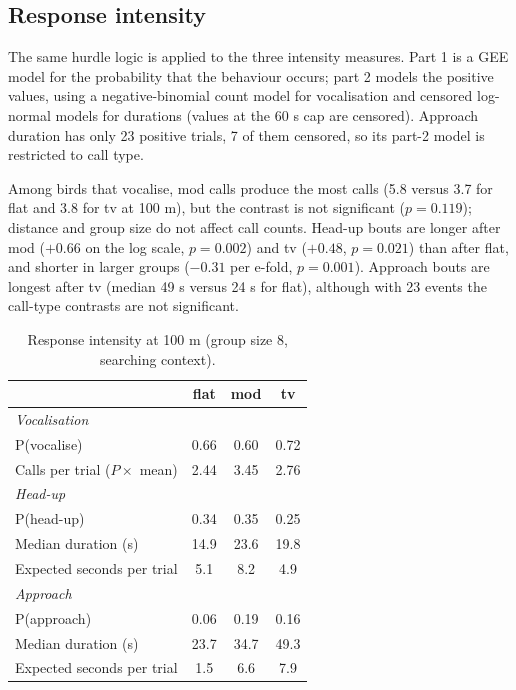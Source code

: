\documentclass{apmcmthesis}
\begin{document}
\subsection{Response intensity}
The same hurdle logic is applied to the three intensity measures. Part 1 is a GEE model for the
probability that the behaviour occurs; part 2 models the positive values, using a
negative-binomial count model for vocalisation and censored log-normal models for durations
(values at the 60 s cap are censored). Approach duration has only 23 positive trials, 7 of them
censored, so its part-2 model is restricted to call type.

Among birds that vocalise, mod calls produce the most calls (5.8 versus 3.7 for flat and 3.8
for tv at 100 m), but the contrast is not significant ($p=0.119$); distance and group size do
not affect call counts. Head-up bouts are longer after mod ($+0.66$ on the log scale,
$p=0.002$) and tv ($+0.48$, $p=0.021$) than after flat, and shorter in larger groups
($-0.31$ per e-fold, $p=0.001$). Approach bouts are longest after tv (median 49 s versus 24 s
for flat), although with 23 events the call-type contrasts are not significant.

\begin{table}[htbp]
\centering
\caption{Response intensity at 100 m (group size 8, searching context).}
\label{tab:intensity}
\small
\begin{tabular}{lccc}
\toprule
 & flat & mod & tv \\
\midrule
\multicolumn{4}{l}{\emph{Vocalisation}} \\
P(vocalise) & 0.66 & 0.60 & 0.72 \\
Calls per trial ($P\times$ mean) & 2.44 & 3.45 & 2.76 \\
\midrule
\multicolumn{4}{l}{\emph{Head-up}} \\
P(head-up) & 0.34 & 0.35 & 0.25 \\
Median duration (s) & 14.9 & 23.6 & 19.8 \\
Expected seconds per trial & 5.1 & 8.2 & 4.9 \\
\midrule
\multicolumn{4}{l}{\emph{Approach}} \\
P(approach) & 0.06 & 0.19 & 0.16 \\
Median duration (s) & 23.7 & 34.7 & 49.3 \\
Expected seconds per trial & 1.5 & 6.6 & 7.9 \\
\bottomrule
\end{tabular}
\end{table}
\end{document}
